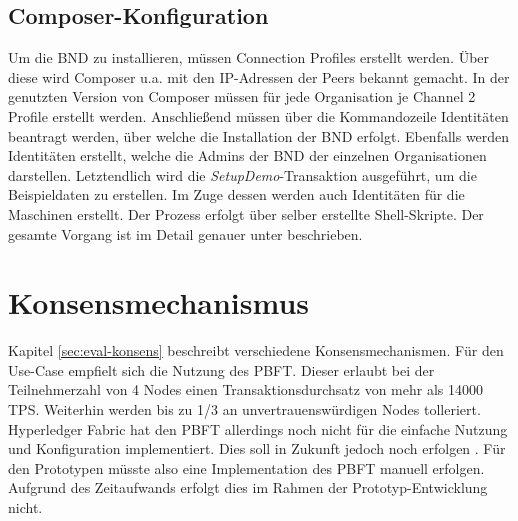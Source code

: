 \subsection{Composer-Konfiguration}
Um die BND zu installieren, müssen Connection Profiles erstellt werden. Über diese wird Composer u.a. mit den IP-Adressen der Peers bekannt gemacht. In der genutzten Version von Composer müssen für jede Organisation je Channel 2 Profile erstellt werden. Anschließend müssen über die Kommandozeile Identitäten beantragt werden, über welche die Installation der BND erfolgt. Ebenfalls werden Identitäten erstellt, welche die Admins der BND der einzelnen Organisationen darstellen. Letztendlich wird die \textit{SetupDemo}-Transaktion ausgeführt, um die Beispieldaten zu erstellen. Im Zuge dessen werden auch Identitäten für die Maschinen erstellt. Der Prozess erfolgt über selber erstellte Shell-Skripte. Der gesamte Vorgang ist im Detail genauer unter \cite{HyperledgerComposerTeamMultiOrgDeployment} beschrieben.

\section{Konsensmechanismus}
\label{sec:consensus-choose}
Kapitel \ref{sec:eval-konsens} beschreibt verschiedene Konsensmechanismen. Für den Use-Case empfielt sich die Nutzung des PBFT. Dieser erlaubt bei der Teilnehmerzahl von 4 Nodes einen Transaktionsdurchsatz von mehr als 14000 TPS. Weiterhin werden bis zu 1/3 an unvertrauenswürdigen Nodes tolleriert. Hyperledger Fabric hat den PBFT allerdings noch nicht für die einfache Nutzung und Konfiguration implementiert. Dies soll in Zukunft jedoch noch erfolgen \cite{HyperledgerFabricTeamPluggableConsensusImplementations}. Für den Prototypen müsste also eine Implementation des PBFT manuell erfolgen. Aufgrund des Zeitaufwands erfolgt dies im Rahmen der Prototyp-Entwicklung nicht.

